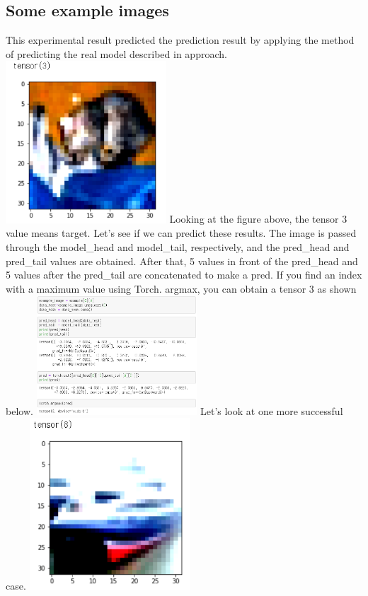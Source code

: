 \documentclass[extendedabs]{bmvc2k}
\begin{document}
  \subsection{Some example images}
  This experimental result predicted the prediction result by applying the method of predicting the real model described in approach.
  \newline \includegraphics[width=6cm]{images/16_project.PNG}
  \newline Looking at the figure above, the tensor 3 value means target. Let's see if we can predict these results.
  The image is passed through the model\_head and model\_tail, respectively, and the pred\_head and pred\_tail values are obtained. After that, 
  5 values in front of the pred\_head and 5 values after the pred\_tail are concatenated to make a pred. If you find an index with a maximum value using Torch.
  argmax, you can obtain a tensor 3 as shown below.
  \newline \includegraphics[width=6cm]{images/17_project.PNG}
  \newline Let's look at one more successful case.
  \newline \includegraphics[width=6cm]{images/18_project.PNG}
\end{document}
